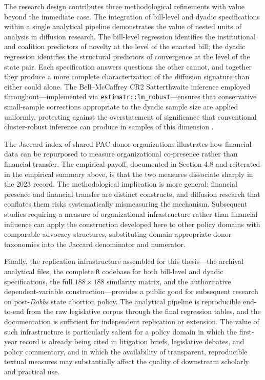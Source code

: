 The research design contributes three methodological refinements with value beyond the immediate case. The integration of bill-level and dyadic specifications within a single analytical pipeline demonstrates the value of nested units of analysis in diffusion research. The bill-level regression identifies the institutional and coalition predictors of novelty at the level of the enacted bill; the dyadic regression identifies the structural predictors of convergence at the level of the state pair. Each specification answers questions the other cannot, and together they produce a more complete characterization of the diffusion signature than either could alone. The Bell--McCaffrey CR2 Satterthwaite inference employed throughout---implemented via \texttt{estimatr::lm\_robust}---ensures that conservative small-sample corrections appropriate to the dyadic sample size are applied uniformly, protecting against the overstatement of significance that conventional cluster-robust inference can produce in samples of this dimension \parencite{pustejovskyCRVEAnywhere2018}.
 
The Jaccard index of shared PAC donor organizations illustrates how financial data can be repurposed to measure organizational co-presence rather than financial transfer. The empirical payoff, documented in Section 4.8 and reiterated in the empirical summary above, is that the two measures dissociate sharply in the 2023 record. The methodological implication is more general: financial presence and financial transfer are distinct constructs, and diffusion research that conflates them risks systematically mismeasuring the mechanism. Subsequent studies requiring a measure of organizational infrastructure rather than financial influence can apply the construction developed here to other policy domains with comparable advocacy structures, substituting domain-appropriate donor taxonomies into the Jaccard denominator and numerator.
 
Finally, the replication infrastructure assembled for this thesis---the archival analytical files, the complete \texttt{R} codebase for both bill-level and dyadic specifications, the full $188 \times 188$ similarity matrix, and the authoritative dependent-variable construction---provides a public good for subsequent research on post-\textit{Dobbs} state abortion policy. The analytical pipeline is reproducible end-to-end from the raw legislative corpus through the final regression tables, and the documentation is sufficient for independent replication or extension. The value of such infrastructure is particularly salient for a policy domain in which the first-year record is already being cited in litigation briefs, legislative debates, and policy commentary, and in which the availability of transparent, reproducible textual measures may substantially affect the quality of downstream scholarly and practical use.
 
